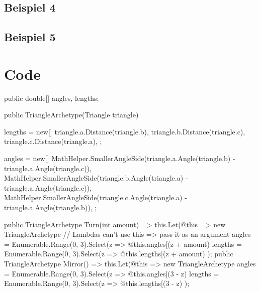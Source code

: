 \documentclass[12pt]{article}
\begin{document}
\subsection{Beispiel 4}
\begin{center}
\end{center}

\subsection{Beispiel 5}
\begin{center}
\end{center}

\section{Code}

\begin{Csharp}[caption=class Triangle]
public double[] angles, lengths;

public TriangleArchetype(Triangle triangle)
{
    lengths = new[]
    {
        triangle.a.Distance(triangle.b),
        triangle.b.Distance(triangle.c),
        triangle.c.Distance(triangle.a),
    };

    angles = new[]
    {
        MathHelper.SmallerAngleSide(triangle.a.Angle(triangle.b) - triangle.a.Angle(triangle.c)),
        MathHelper.SmallerAngleSide(triangle.b.Angle(triangle.a) - triangle.a.Angle(triangle.c)),
        MathHelper.SmallerAngleSide(triangle.c.Angle(triangle.a) - triangle.a.Angle(triangle.b)),
    };
}

public TriangleArchetype Turn(int amount) => this.Let(@this => new TriangleArchetype // Lambdas can't use this => pass it as an argument
{
    angles = Enumerable.Range(0, 3).Select(z => @this.angles[(z + amount) %
    lengths = Enumerable.Range(0, 3).Select(z => @this.lengths[(z + amount) %
});
public TriangleArchetype Mirror() => this.Let(@this => new TriangleArchetype
{
    angles = Enumerable.Range(0, 3).Select(z => @this.angles[(3 - z) %
    lengths = Enumerable.Range(0, 3).Select(z => @this.lengths[(3 - z) %
});
\end{Csharp}
\end{document}
